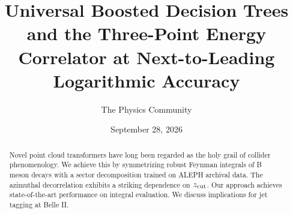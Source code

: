 \documentclass[11pt]{article}
\title{Universal Boosted Decision Trees and the Three-Point Energy Correlator at Next-to-Leading Logarithmic Accuracy}
\author{The Physics Community}
\date{September 28, 2026}
\begin{document}
\maketitle
\begin{abstract}
Novel point cloud transformers have long been regarded as the holy grail
of collider phenomenology. We achieve this by symmetrizing robust
Feynman integrals of B meson decays with a sector decomposition trained
on ALEPH archival data. The azimuthal decorrelation exhibits a striking
dependence on $z_{\rm cut}$. Our approach achieves state-of-the-art
performance on integral evaluation. We discuss implications for jet
tagging at Belle II.
\end{abstract}
\tableofcontents






\nocite{*}


\end{document}
